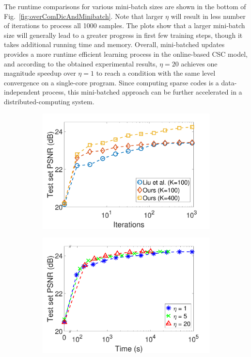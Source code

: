 The runtime comparisons for various mini-batch sizes are shown in the bottom of Fig.\ \ref{fig:overComDicAndMinibatch}. Note that larger $\eta$ will result in less number of iterations to process all 1000 samples. The plots show that a larger mini-batch size will generally lead to a greater progress in first few training steps, though it takes additional running time and memory. Overall, mini-batched updates provides a more runtime efficient learning process in the online-based CSC model, and according to the obtained experimental results, $\eta=20$ achieves one magnitude speedup over $\eta=1$ to reach a condition with the same level convergence on a single-core program. Since computing sparse codes is a data-independent process, this mini-batched approach can be further accelerated in a distributed-computing system.
\begin{figure}[h]
\centering
\begin{subfigure}{0.5\textwidth}
  \includegraphics[width=1\linewidth]{figure/overComplete-ite.pdf}
\end{subfigure}
\begin{subfigure}{0.5\textwidth}
  \includegraphics[width=1\linewidth]{figure/minibatch.pdf}
\end{subfigure}


\end{figure}
